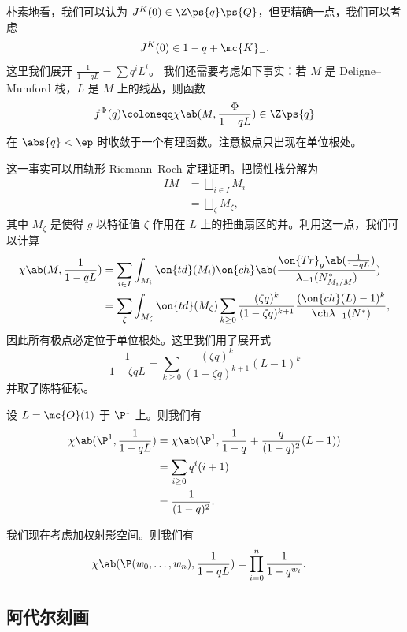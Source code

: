 朴素地看，我们可以认为 \(J^K(0) \in \Z\ps{q}\ps{Q}\)，但更精确一点，我们可以考虑
\[ J^K(0) \in 1-q + \mc{K}_-. \]
这里我们展开 \(\frac{1}{1-qL} = \sum q^i L^i\)。
我们还需要考虑如下事实：若 \(M\) 是 Deligne–Mumford 栈，\(L\) 是 \(M\) 上的线丛，则函数
\[ f^{\Phi}(q) \coloneqq \chi\ab(M, \frac{\Phi}{1-qL}) \in \Z \ps{q} \]
在 \(\abs{q} < \ep\) 时收敛于一个有理函数。注意极点只出现在单位根处。

这一事实可以用轨形 Riemann–Roch 定理证明。把惯性栈分解为
\begin{align*}
    IM &= \bigsqcup_{i \in I} M_i \\
    &= \bigsqcup_{\zeta} M_{\zeta},
\end{align*}
其中 \(M_{\zeta}\) 是使得 \(g\) 以特征值 \(\zeta\) 作用在 \(L\) 上的扭曲扇区的并。利用这一点，我们可以计算
\begin{align*}
    \chi\ab(M, \frac{1}{1-qL}) &= \sum_{i \in I} \int_{M_i} \on{td}(M_i) \on{ch} \ab(\frac{ \on{Tr}_g \ab(\frac{1}{1-qL}) }{\lambda_{-1}(N_{M_i/M}^*)}) \\
    &= \sum_{\zeta} \int_{M_{\zeta}} \on{td}(M_{\zeta}) \sum_{k \geq 0} \frac{(\zeta q)^k}{(1-\zeta q)^{k+1}} \frac{( \on{ch}(L)-1 )^k}{\ch \lambda_{-1}(N^*)},
\end{align*}
因此所有极点必定位于单位根处。这里我们用了展开式
\[ \frac{1}{1-\zeta q L} = \sum_{k \geq 0} \frac{(\zeta q)^k}{(1-\zeta q)^{k+1}} (L-1)^k \]
并取了陈特征标。

\begin{exm}
    设 \(L = \mc{O}(1)\) 于 \(\P^1\) 上。则我们有
    \begin{align*}
        \chi\ab(\P^1, \frac{1}{1-qL}) &= \chi\ab(\P^1, \frac{1}{1-q} + \frac{q}{(1-q)^2}(L-1)) \\
        &= \sum_{i \geq 0} q^i (i+1) \\
        &= \frac{1}{(1-q)^2}.
    \end{align*}
\end{exm}

\begin{exm}
    我们现在考虑加权射影空间。则我们有
    \begin{align*}
        \chi\ab(\P(w_0, \ldots, w_n), \frac{1}{1-qL}) &= \prod_{i=0}^n \frac{1}{1-q^{w_i}}. 
    \end{align*}
\end{exm}

\subsection{阿代尔刻画}%
\label{sub:Adelic characterization}

